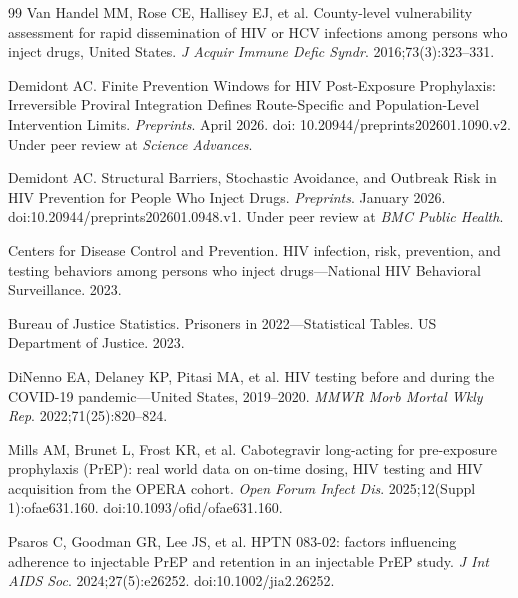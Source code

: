 \documentclass[11pt]{article}
\begin{document}
\begin{thebibliography}{99}
 Van Handel MM, Rose CE, Hallisey EJ, et al. County-level vulnerability assessment for rapid dissemination of HIV or HCV infections among persons who inject drugs, United States. \emph{J Acquir Immune Defic Syndr}. 2016;73(3):323--331.

 Demidont AC. Finite Prevention Windows for HIV Post-Exposure Prophylaxis: Irreversible Proviral Integration Defines Route-Specific and Population-Level Intervention Limits. \emph{Preprints}. April 2026. doi: 10.20944/preprints202601.1090.v2. Under peer review at \emph{Science Advances}.

 Demidont AC. Structural Barriers, Stochastic Avoidance, and Outbreak Risk in HIV Prevention for People Who Inject Drugs. \emph{Preprints}. January 2026. doi:10.20944/preprints202601.0948.v1. Under peer review at \emph{BMC Public Health}.

 Centers for Disease Control and Prevention. HIV infection, risk, prevention, and testing behaviors among persons who inject drugs---National HIV Behavioral Surveillance. 2023.

 Bureau of Justice Statistics. Prisoners in 2022---Statistical Tables. US Department of Justice. 2023.

 DiNenno EA, Delaney KP, Pitasi MA, et al. HIV testing before and during the COVID-19 pandemic---United States, 2019--2020. \textit{MMWR Morb Mortal Wkly Rep}. 2022;71(25):820--824.

 Mills AM, Brunet L, Frost KR, et al. Cabotegravir long-acting for pre-exposure prophylaxis (PrEP): real world data on on-time dosing, HIV testing and HIV acquisition from the OPERA cohort. \emph{Open Forum Infect Dis}. 2025;12(Suppl 1):ofae631.160. doi:10.1093/ofid/ofae631.160.

 Psaros C, Goodman GR, Lee JS, et al. HPTN 083-02: factors influencing adherence to injectable PrEP and retention in an injectable PrEP study. \emph{J Int AIDS Soc}. 2024;27(5):e26252. doi:10.1002/jia2.26252.

\end{thebibliography}
\end{document}
